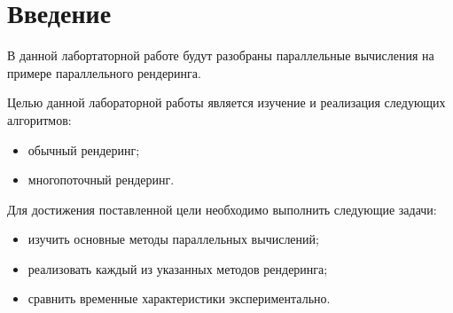 \tableofcontents{}


\chapter{Введение}
\label{cha:appendix2}

В данной лабортаторной работе будут разобраны параллельные вычисления на примере параллельного рендеринга.

Целью данной лабораторной работы является изучение и реализация следующих алгоритмов: 
\begin{itemize}
    \item обычный рендеринг;
    \item многопоточный рендеринг.
\end{itemize}

Для достижения поставленной цели необходимо выполнить следующие задачи: 
\begin{itemize}
    \item изучить основные методы параллельных вычислений;
    \item реализовать каждый из указанных методов рендеринга;
    \item сравнить временные характеристики экспериментально.
\end{itemize}